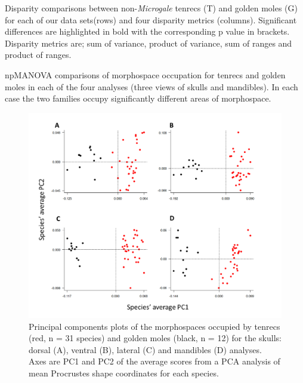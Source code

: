 \documentclass[12pt,a4paper]{article}
\begin{document}
	\begin{table}[h]			
	\caption[Summary of disparity comparisons between non-\textit{Microgale} tenrecs and golden moles]
		{Disparity comparisons between non-\textit{Microgale} tenrecs (T) and golden moles (G) for each of our data sets(rows) and four disparity metrics (columns). Significant differences are highlighted in bold with the corresponding p value in brackets. Disparity metrics are; sum of variance, product of variance, sum of ranges and product of ranges. }
	\centering
	 
	\label{tab:disp.nonmic.summary}  
	\end{table}
	
	
	\begin{table}[h]			

	\caption[Summary of npMANOVA comparisons of morphospace occupation for tenrecs and golden moles]
		{npMANOVA comparisons of morphospace occupation for tenrecs and golden moles in each of the four analyses (three views of skulls and mandibles). In each case the two families occupy significantly different areas of morphospace.}
	\centering
	 
	\label{tab:npmanova.summary}  
	\end{table}
		
	\begin{figure}[H]
	\centering
	\includegraphics[width=1\linewidth]{figures/FourPlotPCA.png}
	\caption[Principal components plots of the morphospaces occupied by tenrecs and golden moles]
		{Principal components plots of the morphospaces occupied by tenrecs (red, n = 31 species) and golden moles (black, n = 12) for the skulls: dorsal (A), ventral (B), lateral (C) and mandibles (D) analyses. Axes are PC1 and PC2 of the average scores from a PCA analysis of mean Procrustes shape coordinates for each species. }
	\label{fig:fourPCA}
	\end{figure}
\end{document}
